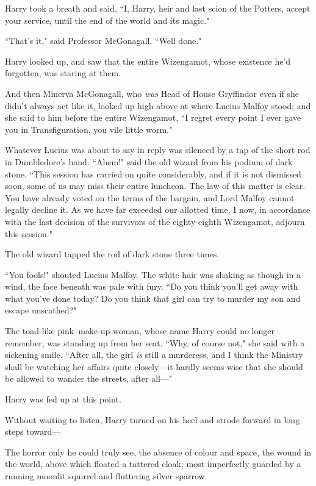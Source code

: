 Harry took a breath and said, ``I, Harry, heir and last scion of the Potters, accept your service, until the end of the world and its magic."

``That's it," said Professor McGonagall. ``Well done."

Harry looked up, and saw that the entire Wizengamot, whose existence he'd forgotten, was staring at them.

And then Minerva McGonagall, who \emph{was} Head of House Gryffindor even if she didn't always act like it, looked up high above at where Lucius Malfoy stood; and she said to him before the entire Wizengamot, ``I regret every point I ever gave you in Transfiguration, you vile little worm."

Whatever Lucius was about to say in reply was silenced by a tap of the short rod in Dumbledore's hand. ``Ahem!" said the old wizard from his podium of dark stone. ``This session has carried on quite considerably, and if it is not dismissed soon, some of us may miss their entire luncheon. The law of this matter is clear. You have already voted on the terms of the bargain, and Lord Malfoy cannot legally decline it. As we have far exceeded our allotted time, I now, in accordance with the last decision of the survivors of the eighty-eighth Wizengamot, adjourn this session."

The old wizard tapped the rod of dark stone three times.

``You fools!" shouted Lucius Malfoy. The white hair was shaking as though in a wind, the face beneath was pale with fury. ``Do you think you'll get away with what you've done today? Do you think that girl can try to murder my son and escape unscathed?"

The toad-like pink--make-up woman, whose name Harry could no longer remember, was standing up from her seat. ``Why, of course not," she said with a sickening smile. ``After all, the girl \emph{is} still a murderess, and I think the Ministry shall be watching her affairs quite closely—it hardly seems wise that she should be allowed to wander the streets, after all—"

Harry was fed up at this point.

Without waiting to listen, Harry turned on his heel and strode forward in long steps toward—

The horror only he could truly see, the absence of colour and space, the wound in the world, above which floated a tattered cloak; most imperfectly guarded by a running moonlit squirrel and fluttering silver sparrow.

